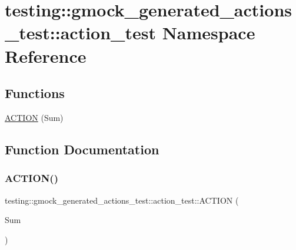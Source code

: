 \hypertarget{namespacetesting_1_1gmock__generated__actions__test_1_1action__test}{}\section{testing\+::gmock\+\_\+generated\+\_\+actions\+\_\+test\+::action\+\_\+test Namespace Reference}
\label{namespacetesting_1_1gmock__generated__actions__test_1_1action__test}
\subsection*{Functions}
\begin{DoxyCompactItemize}
\item 
\mbox{\hyperlink{namespacetesting_1_1gmock__generated__actions__test_1_1action__test_a78d00ea4fff98d5cd3f73f8f03800bbe}{A\+C\+T\+I\+ON}} (Sum)
\end{DoxyCompactItemize}


\subsection{Function Documentation}
\mbox{\label{namespacetesting_1_1gmock__generated__actions__test_1_1action__test_a78d00ea4fff98d5cd3f73f8f03800bbe}} 
\subsubsection{\texorpdfstring{ACTION()}{ACTION()}}
{\footnotesize\ttfamily testing\+::gmock\+\_\+generated\+\_\+actions\+\_\+test\+::action\+\_\+test\+::\+A\+C\+T\+I\+ON (\begin{DoxyParamCaption}\item[{Sum}]{ }\end{DoxyParamCaption})}

